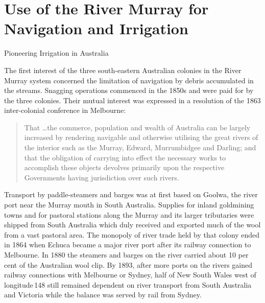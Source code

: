 
\setcounter{endnote}{0}

\chapter{Use of the River Murray for Navigation and Irrigation}
\label{ch:murray}
%
{Pioneering Irrigation in Australia}

The first interest of the three south-eastern Australian colonies in
the River Murray system concerned the limitation of navigation by
debris accumulated in the streams.  Snagging operations commenced in
the 1850s and were paid for by the three colonies.  Their mutual
interest was expressed in a resolution of the 1863 inter-colonial
conference in Melbourne:
\begin{quote}
	That \ldots the commerce, population and wealth of Australia
	can be largely increased by rendering navigable and otherwise
	utilising the great rivers of the interior such as the Murray,
	Edward, Murrumbidgee and Darling; and that the obligation of
	carrying into effect the necessary works to accomplish these
	objects devolves primarily upon the respective Governments
	having jurisdiction over such rivers.
\end{quote}

Transport by paddle-steamers  and barges was at
first based on Gool\-wa,  the river port near the
Murray mouth in South Australia.  Supplies for inland goldmining towns
and for pastoral stations along the Murray and its larger tributaries
were shipped from South Australia which duly received and exported
much of the wool from a vast pastoral area.  The monopoly of river
trade held by that colony ended in 1864 when Echuca  became a major river port after its railway connection to
Melbourne.  In 1880 the steamers and barges on the river carried about
10 per cent of the Australian wool clip.  By 1893, after more ports on
the rivers gained railway connections with Melbourne or Sydney, half
of New South Wales west of longitude\,148 still remained dependent on
river transport from South Australia and Victoria while the balance
was served by rail from Sydney.

